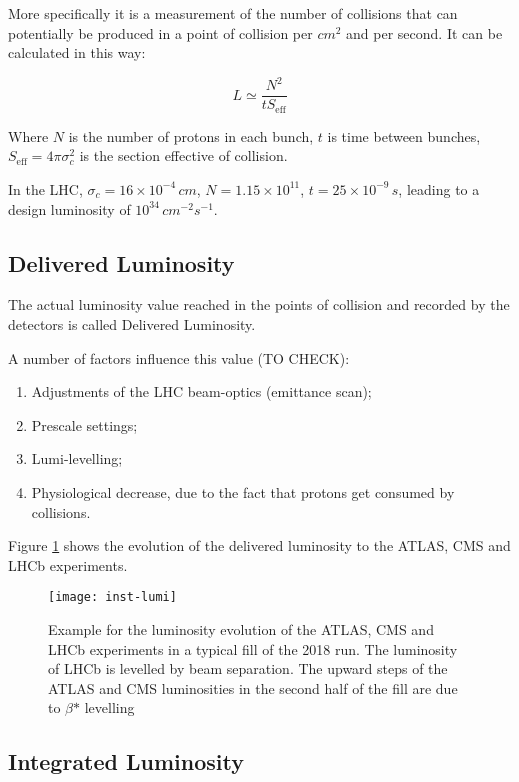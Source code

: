 More specifically it is a measurement of the number of collisions that can potentially be produced in a point of collision per $cm^2$ and per second. It can be calculated in this way:

\begin{equation}
	L \simeq  \frac{N^2}{t S_{\text{eff}}}
\end{equation}

Where $N$ is the number of protons in each bunch, $t$ is time between bunches, $S_{\text{eff}} = 4 \pi \sigma_c^2$ is the section effective of collision.

In the LHC, $\sigma _c= 16\times 10^{-4}\, cm$, $N = 1.15\times10^{11}$, $t = 25 \times 10^{-9}\, s$, leading to a design luminosity of $10^{34}\, cm^{-2}s^{-1}$.

\subsection{Delivered Luminosity}

The actual luminosity value reached in the points of collision and recorded by the detectors is called Delivered Luminosity.

A number of factors influence this value (TO CHECK):

\begin{enumerate}
	\item Adjustments of the LHC beam-optics (emittance scan);
	\item Prescale settings;
	\item Lumi-levelling;
	\item Physiological decrease, due to the fact that protons get consumed by collisions.
\end{enumerate}

Figure \ref{fig:lum_evolution} shows the evolution of the delivered luminosity to the ATLAS, CMS and LHCb experiments.


\begin{figure}
	\centerline{
		\texttt{[image: inst-lumi]}}
	\caption{Example for the luminosity evolution of the ATLAS, CMS and LHCb experiments in a typical fill of the 2018 run. The luminosity of LHCb is levelled by beam separation. The upward steps of the ATLAS and CMS luminosities in the second half of the fill are due to $\beta\text{*}$ levelling
		\cite{Wenninger:2018cgs}}
	\label{fig:lum_evolution}
\end{figure}


\label{int_lum_def}
\subsection{Integrated Luminosity}

